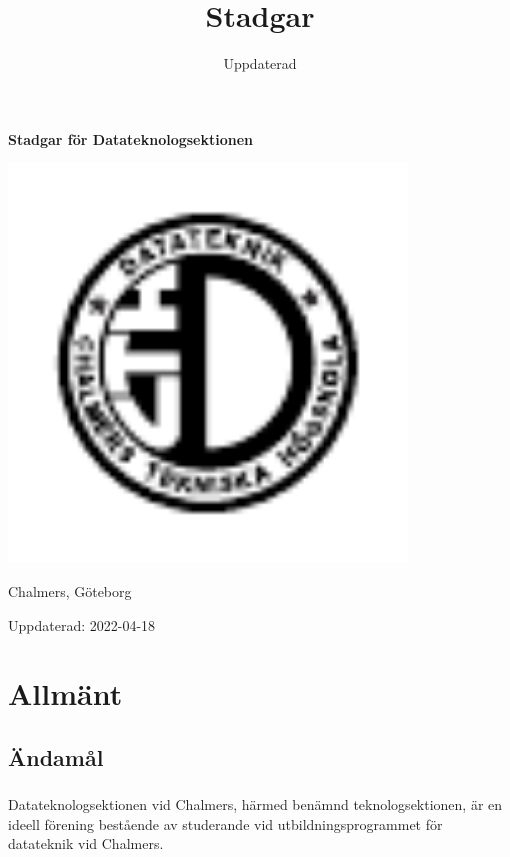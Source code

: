 \documentclass[a4paper]{dtek}
\title{Stadgar}
\date{Uppdaterad \updated}
\newcommand{\updated}{2022-04-18} %
\begin{document}
\makeheadfoot

\vspace*{\fill}
\begin{center}
{\Huge \textbf{Stadgar för Datateknologsektionen}}
\par\bigskip
\includegraphics[width=300pt]{dteklogo.pdf}
\par\bigskip
{\LARGE Chalmers, Göteborg}
\end{center}
\vspace*{\fill}
\begin{center}
{\LARGE Uppdaterad: \updated}
\end{center}
\vspace*{\fill}


\newpage
\setcounter{tocdepth}{1}
\tableofcontents
\newpage

\section{Allmänt}
\subsection{Ändamål}
\subsubsection{}
Datateknologsektionen vid Chalmers, härmed benämnd teknologsektionen, är en ideell förening bestående av studerande vid utbildningsprogrammet för datateknik vid Chalmers.
\end{document}
